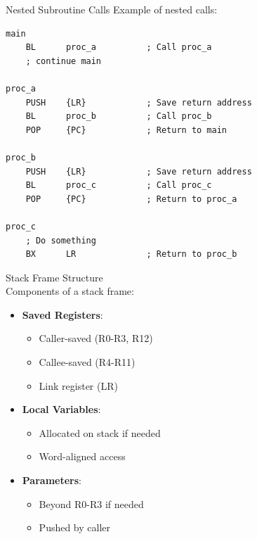 \begin{example2}{Nested Subroutine Calls}
Example of nested calls:
\begin{lstlisting}[language=armasm, style=base]
main
    BL      proc_a          ; Call proc_a
    ; continue main
    
proc_a
    PUSH    {LR}            ; Save return address
    BL      proc_b          ; Call proc_b
    POP     {PC}            ; Return to main
    
proc_b
    PUSH    {LR}            ; Save return address
    BL      proc_c          ; Call proc_c
    POP     {PC}            ; Return to proc_a
    
proc_c
    ; Do something
    BX      LR              ; Return to proc_b
\end{lstlisting}
\end{example2}

\begin{definition}{Stack Frame Structure}\\
Components of a stack frame:
\begin{itemize}
  \item \textbf{Saved Registers}:
    \begin{itemize}
      \item Caller-saved (R0-R3, R12)
      \item Callee-saved (R4-R11)
      \item Link register (LR)
    \end{itemize}
  \item \textbf{Local Variables}:
    \begin{itemize}
      \item Allocated on stack if needed
      \item Word-aligned access
    \end{itemize}
  \item \textbf{Parameters}:
    \begin{itemize}
      \item Beyond R0-R3 if needed
      \item Pushed by caller
    \end{itemize}
\end{itemize}

\end{definition}

